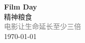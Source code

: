 \vspace*{\fill}
\begin{center}
    \textcolor{orange!50}{\Huge\textbf{Film Day}} \\[1em]
    \textcolor{orange!60!white}{\Large 精神粮食} \\[2em]
    \textcolor{gray}{\large 电影让生命延长至少三倍} \\[1em]
    \today
\end{center}
\vspace*{\fill}
\clearpage


\clearpage

\clearpage
